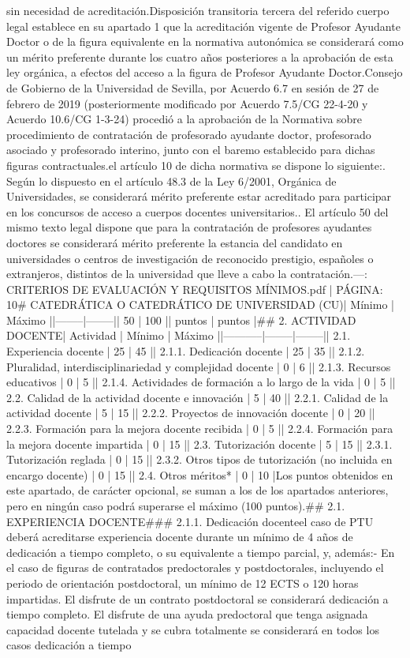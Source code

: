 \documentclass{article}
\begin{document}
\begin{itemize}
{{{{{{{sin necesidad de acreditación.\n\nLa Disposición transitoria tercera del referido cuerpo legal establece en su apartado 1 que la acreditación vigente de Profesor Ayudante Doctor o de la figura equivalente en la normativa autonómica se considerará como un mérito preferente durante los cuatro años posteriores a la aprobación de esta ley orgánica, a efectos del acceso a la figura de Profesor Ayudante Doctor.\n\nEl Consejo de Gobierno de la Universidad de Sevilla, por Acuerdo 6.7 en sesión de 27 de febrero de 2019 (posteriormente modificado por Acuerdo 7.5/CG 22-4-20 y Acuerdo 10.6/CG 1-3-24) procedió a la aprobación de la Normativa sobre procedimiento de contratación de profesorado ayudante doctor, profesorado asociado y profesorado interino, junto con el baremo establecido para dichas figuras contractuales.\n\nEn el artículo 10 de dicha normativa se dispone lo siguiente:\n{}. Según lo dispuesto en el artículo 48.3 de la Ley 6/2001, Orgánica de Universidades, se considerará mérito preferente estar acreditado para participar en los concursos de acceso a cuerpos docentes universitarios.. El artículo 50 del mismo texto legal dispone que para la contratación de profesores ayudantes doctores se considerará mérito preferente la estancia del candidato en universidades o centros de investigación de reconocido prestigio, españoles o extranjeros, distintos de la universidad que lleve a cabo la contratación.\n\n---\n\nFUENTE: CRITERIOS DE EVALUACIÓN Y REQUISITOS MÍNIMOS.pdf | PÁGINA: 10\n# CATEDRÁTICA O CATEDRÁTICO DE UNIVERSIDAD (CU)\n\n| Mínimo | Máximo |\n|--------|--------|\n| 50     | 100    |\n| puntos | puntos |\n\n## 2. ACTIVIDAD DOCENTE\n\n| Actividad | Mínimo | Máximo |\n|-----------|--------|--------|\n| 2.1. Experiencia docente | 25 | 45 |\n| 2.1.1. Dedicación docente | 25 | 35 |\n| 2.1.2. Pluralidad, interdisciplinariedad y complejidad docente | 0 | 6 |\n| 2.1.3. Recursos educativos | 0 | 5 |\n| 2.1.4. Actividades de formación a lo largo de la vida | 0 | 5 |\n| 2.2. Calidad de la actividad docente e innovación | 5 | 40 |\n| 2.2.1. Calidad de la actividad docente | 5 | 15 |\n| 2.2.2. Proyectos de innovación docente | 0 | 20 |\n| 2.2.3. Formación para la mejora docente recibida | 0 | 5 |\n| 2.2.4. Formación para la mejora docente impartida | 0 | 15 |\n| 2.3. Tutorización docente | 5 | 15 |\n| 2.3.1. Tutorización reglada | 0 | 15 |\n| 2.3.2. Otros tipos de tutorización (no incluida en encargo docente) | 0 | 15 |\n| 2.4. Otros méritos* | 0 | 10 |\n\n* Los puntos obtenidos en este apartado, de carácter opcional, se suman a los de los apartados anteriores, pero en ningún caso podrá superarse el máximo (100 puntos).\n\n## 2.1. EXPERIENCIA DOCENTE\n\n### 2.1.1. Dedicación docente\n\nEn el caso de PTU deberá acreditarse experiencia docente durante un mínimo de 4 años de dedicación a tiempo completo, o su equivalente a tiempo parcial, y, además:\n\n- En el caso de figuras de contratados predoctorales y postdoctorales, incluyendo el periodo de orientación postdoctoral, un mínimo de 12 ECTS o 120 horas impartidas. El disfrute de un contrato postdoctoral se considerará dedicación a tiempo completo. El disfrute de una ayuda predoctoral que tenga asignada capacidad docente tutelada y se cubra totalmente se considerará en todos los casos dedicación a tiempo }}}}}}}
\end{itemize}
\end{document}
